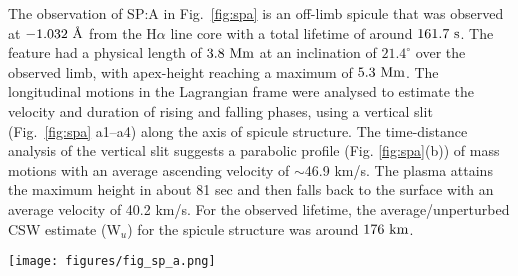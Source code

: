 \documentclass[12pt]{ociamthesis}
\newcommand{\degs}{^{\circ}}
\newcommand{\angstrom}{\textup{\AA}}
\begin{document}
%
The observation of SP:A in Fig.~\ref{fig:spa} is an off-limb spicule that was observed at $-1.032~\angstrom$ from the H$\alpha$ line core with a total lifetime of around $161.7~\rm{s}$. The feature had a physical length of $3.8~\rm{Mm}$ at an inclination of $21.4\degs$ over the observed limb, with apex-height reaching a maximum of $5.3~\rm{Mm}$. The longitudinal motions in the Lagrangian frame were analysed to estimate the velocity and duration of rising and falling phases, using a vertical slit (Fig.~\ref{fig:spa} a1–a4) along the axis of spicule structure. The time-distance analysis of the vertical slit suggests a parabolic profile (Fig. \ref{fig:spa}(b)) of mass motions with an average ascending velocity of $\sim$46.9 km/s. The plasma attains the maximum height in about 81 sec and then falls back to the surface with an average velocity of 40.2 km/s. For the observed lifetime, the average/unperturbed CSW estimate (W$_{u}$) for the spicule structure was around $176~\rm{km}$.
\begin{figure*}
\texttt{[image: figures/fig\_sp\_a.png]}
\caption{Panels (a1) – (a4) show the temporal evolution of candidate spicule feature (SP:A) in the H$\alpha$ passband at four instances, with positions of vertical (cyan) and horizontal (yellow) slits used for the estimation of field-aligned mass flows and CSW respectively. Panel (b) shows the time-distance plot from the vertical slit on the spicule, highlighting the rise- and fall-phases of field-aligned mass flow. The maximum height attained by the visible plasma is marked with the ‘+’ symbol, along with estimated velocities (46.9 km/s, 40.25 km/s). Bottom panel (c) shows an example of Gaussian fit for intensity magnitudes for horizontal slit location (marked as a yellow line on (a1) – (a4)), with error bars, denoting the standard deviation for intensity values. The vertical black line marks the position of the amplitude of Gaussian fit, while shaded-regions mark average/unperturbed width (W$_{u}$) during spicule lifetime and perturbed/instantaneous width (W). This figure is taken from \cite{Dover2020ApJ90572D} was produced by Dr. Sharma.}
\label{fig:spa} 
\end{figure*}
\end{document}
